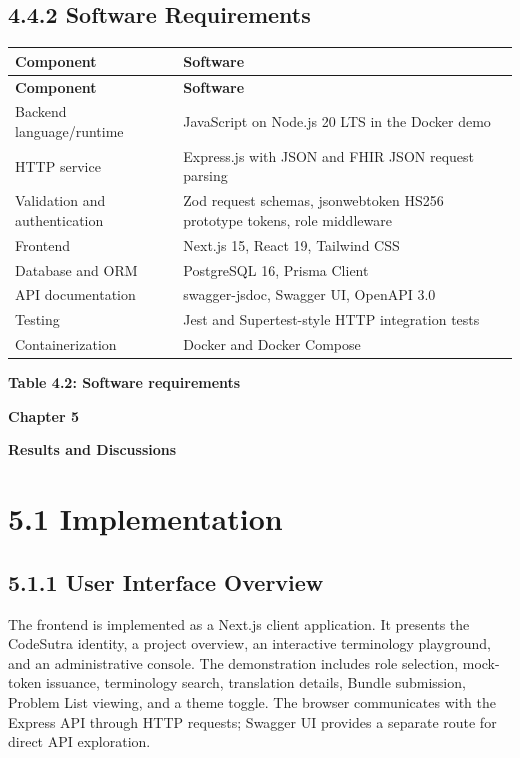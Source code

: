 \documentclass[12pt,a4paper,oneside]{report}
\begin{document}
\subsection*{4.4.2 Software Requirements}
\begin{longtable}{|p{}|p{}|}
\hline
\textbf{Component} & \textbf{Software} \\ \hline
\endfirsthead
\hline \textbf{Component} & \textbf{Software} \\ \hline\endhead
Backend language/runtime & JavaScript on Node.js 20 LTS in the Docker demo \\ \hline
HTTP service & Express.js with JSON and FHIR JSON request parsing \\ \hline
Validation and authentication & Zod request schemas, jsonwebtoken HS256 prototype tokens, role middleware \\ \hline
Frontend & Next.js 15, React 19, Tailwind CSS \\ \hline
Database and ORM & PostgreSQL 16, Prisma Client \\ \hline
API documentation & swagger-jsdoc, Swagger UI, OpenAPI 3.0 \\ \hline
Testing & Jest and Supertest-style HTTP integration tests \\ \hline
Containerization & Docker and Docker Compose \\ \hline
\end{longtable}
\vspace{4pt}
\smallskip\textbf{\textbf{Table 4.2: Software requirements}}\
\clearpage
\clearpage\begin{center}\Large\textbf{Chapter 5}\end{center}
\begin{center}\LARGE\textbf{\textbf{Results and Discussions}}\end{center}\vspace{8pt}
\section*{5.1 Implementation}
\subsection*{5.1.1 User Interface Overview}
The frontend is implemented as a Next.js client application. It presents the CodeSutra identity, a project overview, an interactive terminology playground, and an administrative console. The demonstration includes role selection, mock-token issuance, terminology search, translation details, Bundle submission, Problem List viewing, and a theme toggle. The browser communicates with the Express API through HTTP requests; Swagger UI provides a separate route for direct API exploration.
\end{document}
